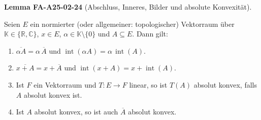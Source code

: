 \documentclass[10pt, letterpaper]{article}
\newcommand{\CustomHeading}[3]{%
  \par\medskip\noindent%
  \textbf{#1 #2} \textnormal{(#3)}.\enskip%
}
\newenvironment{LEM}[2]{\begin{unitbox}\CustomHeading{Lemma}{#1}{#2}}{\end{unitbox}}
\begin{document}
\begin{LEM}{FA-A25-02-24}{Abschluss, Inneres, Bilder und absolute Konvexität}
Seien $E$ ein normierter (oder allgemeiner: topologischer) Vektorraum über $\mathbb{K}\in\{\mathbb{R},\mathbb{C}\}$, $x\in E$, $\alpha\in\mathbb{K}\setminus\{0\}$ und $A\subseteq E$. Dann gilt:
\begin{enumerate}\itemsep0.25em
\item[(a)] $\overline{\alpha A}=\alpha\,\overline{A}$ und $\operatorname{int}(\alpha A)=\alpha\,\operatorname{int}(A)$.
\item[(b)] $\overline{x+A}=x+\overline{A}$ und $\operatorname{int}(x+A)=x+\operatorname{int}(A)$.
\item[(c)] Ist $F$ ein Vektorraum und $T:E\to F$ linear, so ist $T(A)$ absolut konvex, falls $A$ absolut konvex ist.
\item[(d)] Ist $A$ absolut konvex, so ist auch $\overline{A}$ absolut konvex.
\end{enumerate}
\end{LEM}
\end{document}
